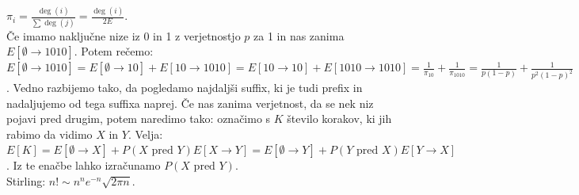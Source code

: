 \documentclass[a4paper, oneside, 12pt]{article}
\theoremstyle{definition}
\begin{document}
$\pi_i = \frac{\deg(i)}{\sum \deg(j)} = \frac{\deg(i)}{2E}$.\\
Če imamo naključne nize iz 0 in 1 z verjetnostjo $p$ za 1 in nas zanima $E[\emptyset \to 1010]$. Potem rečemo:
$E[\emptyset \to 1010] = E[\emptyset \to 10] + E[10 \to 1010] = E[10 \to 10] + E[1010\to 1010] =
\frac{1}{\pi_{10}} + \frac{1}{\pi_{1010}} = \frac{1}{p(1-p)} + \frac{1}{p^2(1-p)^2}$.
Vedno razbijemo tako, da pogledamo najdaljši suffix, ki je tudi prefix in
nadaljujemo od tega suffixa naprej.
Če nas zanima verjetnost, da se nek niz pojavi pred drugim, potem naredimo tako: označimo s $K$ število korakov,
ki jih rabimo da vidimo $X$ in $Y$. Velja:
$E[K] = E[\emptyset \to X] + P(X \text{ pred } Y)E[X \to Y] =
E[\emptyset \to Y] + P(Y \text{ pred } X)E[Y \to X]$.
Iz te enačbe lahko izračunamo $P(X \text{ pred } Y)$.\\
Stirling: $n! \sim n^n e^{-n} \sqrt{2\pi n}$.\\ \\
\end{document}
